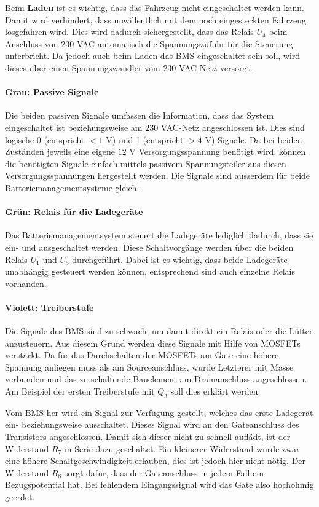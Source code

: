 Beim \textbf{Laden} ist es wichtig, dass das Fahrzeug nicht eingeschaltet werden kann. Damit wird verhindert, dass unwillentlich mit dem noch eingesteckten Fahrzeug losgefahren wird. Dies wird dadurch sichergestellt, dass das Relais $U_4$ beim Anschluss von $230$ VAC automatisch die Spannungszufuhr für die Steuerung unterbricht. Da jedoch auch beim Laden das BMS eingeschaltet sein soll, wird dieses über einen Spannungswandler vom $230$ VAC-Netz versorgt.

\paragraph{Grau: Passive Signale}
Die beiden passiven Signale umfassen die Information, dass das System eingeschaltet ist beziehungsweise am $230$ VAC-Netz angeschlossen ist. Dies sind logische 0 (entspricht $<1$ V) und 1 (entspricht $>4$ V) Signale. Da bei beiden Zuständen jeweils eine eigene $12$ V Versorgungsspannung benötigt wird, können die benötigten Signale einfach mittels passivem Spannungsteiler aus diesen Versorgungsspannungen hergestellt werden. Die Signale sind ausserdem für beide Batteriemanagementsysteme gleich.

\paragraph{Grün: Relais für die Ladegeräte}
Das Batteriemanagementsystem steuert die Ladegeräte lediglich dadurch, dass sie ein- und ausgeschaltet werden. Diese Schaltvorgänge werden über die beiden Relais $U_1$ und $U_5$ durchgeführt. Dabei ist es wichtig, dass beide Ladegeräte unabhängig gesteuert werden können, entsprechend sind auch einzelne Relais vorhanden.

\paragraph{Violett: Treiberstufe}
Die Signale des BMS sind zu schwach, um damit direkt ein Relais oder die Lüfter anzusteuern. Aus diesem Grund werden diese Signale mit Hilfe von MOSFETs verstärkt. Da für das Durchschalten der MOSFETs am Gate eine höhere Spannung anliegen muss als am Sourceanschluss, wurde Letzterer mit Masse verbunden und das zu schaltende Bauelement am Drainanschluss angeschlossen. Am Beispiel der ersten Treiberstufe mit $Q_3$ soll dies erklärt werden:

Vom BMS her wird ein Signal zur Verfügung gestellt, welches das erste Ladegerät ein- beziehungsweise ausschaltet. Dieses Signal wird an den Gateanschluss des Transistors angeschlossen. Damit sich dieser nicht zu schnell auflädt, ist der Widerstand $R_7$ in Serie dazu geschaltet. Ein kleinerer Widerstand würde zwar eine höhere Schaltgeschwindigkeit erlauben, dies ist jedoch hier nicht nötig. Der Widerstand $R_8$ sorgt dafür, dass der Gateanschluss in jedem Fall ein Bezugspotential hat. Bei fehlendem Eingangssignal wird das Gate also hochohmig geerdet.

